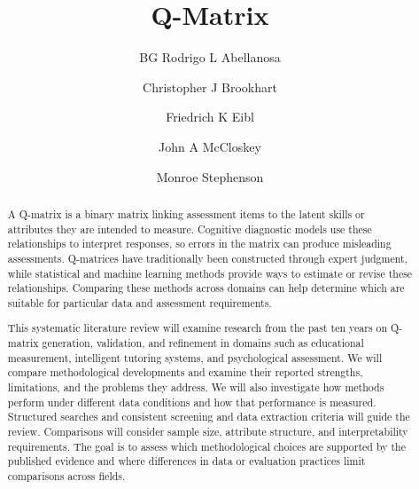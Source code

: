 \documentclass[sigconf,nonacm]{acmart}
\begin{document}
\title{Q-Matrix}

\author{BG Rodrigo L Abellanosa}

\author{Christopher J Brookhart}

\author{Friedrich K Eibl}

\author{John A McCloskey}

\author{Monroe Stephenson}


\renewcommand{\shortauthors}{Abellanosa et al.}

\begin{abstract}
A Q-matrix is a binary matrix linking assessment items to the latent skills or attributes they are intended to measure. Cognitive diagnostic models use these relationships to interpret responses, so errors in the matrix can produce misleading assessments. Q-matrices have traditionally been constructed through expert judgment, while statistical and machine learning methods provide ways to estimate or revise these relationships. Comparing these methods across domains can help determine which are suitable for particular data and assessment requirements.

This systematic literature review will examine research from the past ten years on Q-matrix generation, validation, and refinement in domains such as educational measurement, intelligent tutoring systems, and psychological assessment. We will compare methodological developments and examine their reported strengths, limitations, and the problems they address. We will also investigate how methods perform under different data conditions and how that performance is measured. Structured searches and consistent screening and data extraction criteria will guide the review. Comparisons will consider sample size, attribute structure, and interpretability requirements. The goal is to assess which methodological choices are supported by the published evidence and where differences in data or evaluation practices limit comparisons across fields.

\end{abstract}


\maketitle
\end{document}
